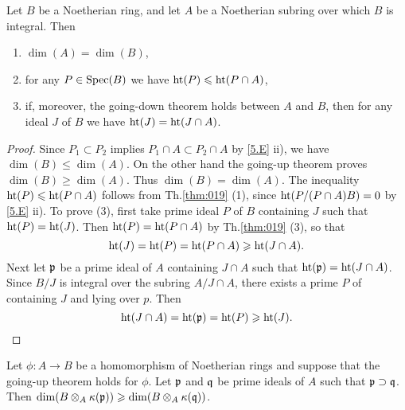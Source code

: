 \documentclass[../main]{subfiles}
\begin{document}
\begin{partheorem}\label{thm:020}
Let $B$ be a Noetherian ring, and let $A$ be a Noetherian subring over which $B$ is integral. Then
\begin{enumerate}[label=(\arabic*)]
    \item $\dim(A)=\dim(B)$,
    \item for any $P \in \operatorname{Spec}(B)$ we have $\operatorname{ht}(P) \leqslant\operatorname{ht}(P \cap A)$,
    \item if, moreover, the going-down theorem holds between $A$ and $B$, then for any ideal $J$ of $B$ we have $\operatorname{ht}(J)=\operatorname{ht}(J \cap A)$.
\end{enumerate}
\end{partheorem}

\begin{proof}
Since $P_1 \subset P_2$ implies $P_1 \cap A \subset P_2 \cap A$ by \ref{5.E} ii), we have \newline $\dim(B) \leqslant \dim(A)$. On the other hand the going-up theorem proves \newline $\dim(B) \geqslant \dim(A)$. Thus $\dim(B)=\dim(A)$. The inequality $\operatorname{ht}(P) \leqslant \operatorname{ht}(P \cap A)$ follows from Th.\ref{thm:019} (1), since $\operatorname{ht}(P /(P \cap A) B)=0$ by \ref{5.E} ii). To prove (3), first take prime ideal $P$ of $B$ containing $J$ such that $\operatorname{ht}(P)=\operatorname{ht}(J)$. Then $\operatorname{ht}(P)=\operatorname{ht}(P \cap A)$ by Th.\ref{thm:019} (3), so that \[\operatorname{ht}(J)=\operatorname{ht}(P)=\operatorname{ht}(P\cap A)\geqslant\operatorname{ht}(J\cap A).\] Next let $\mathfrak{p}$ be a prime ideal of $A$ containing $J\cap A$ such that $\operatorname{ht}(\mathfrak{p})=\operatorname{ht}(J\cap A)$. Since $B/J$ is integral over the subring $A/J\cap A$, there exists a prime $P$ of containing $J$ and lying over $p$. Then \[\operatorname{ht}(J \cap A)=\operatorname{ht}(\mathfrak{p})=\operatorname{ht}(P)\geqslant\operatorname{ht}(J).\]
\end{proof}

\begin{partheorem}\label{thm:021}
Let $\phi: A\longrightarrow B$ be a homomorphism of Noetherian rings and suppose that the going-up theorem holds for $\phi$. Let $\mathfrak{p}$ and $\mathfrak{q}$ be prime ideals of $A$ such that $\mathfrak{p}\supset \mathfrak{q}$. Then $\operatorname{dim}(B \otimes_A \kappa(\mathfrak{p})) \geqslant \operatorname{dim}(B \otimes_A\kappa(\mathfrak{q}))$.
\end{partheorem}
\end{document}
